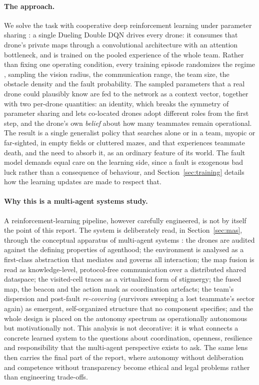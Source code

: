 \paragraph{The approach.}
We solve the task with cooperative deep reinforcement learning under parameter
sharing \citep{gupta2017cooperative}: a single Dueling Double DQN
\citep{mnih2015human,vanhasselt2016double,wang2016dueling} drives every drone:
it consumes that drone's private maps through a convolutional architecture with
an attention bottleneck, and is trained on the pooled experience of the whole
team.
Rather than fixing one operating condition, every training episode randomizes the
regime \citep{tobin2017domain}, sampling the vision radius, the communication
range, the team size, the obstacle density and the fault probability. The sampled
parameters that a real drone could plausibly know are fed to the network as
a context vector,
together with two per-drone quantities: an identity, which breaks the symmetry of
parameter sharing and lets co-located drones adopt different roles from the first
step, and the drone's own \emph{belief} about how many teammates remain
operational. The result is a single generalist policy that searches alone or in a
team, myopic or far-sighted, in empty fields or cluttered mazes, and that
experiences teammate death, and the need to absorb it, as an ordinary feature of
its world. The fault model demands equal care on the learning side, since a fault
is exogenous bad luck rather than a consequence of behaviour, and
Section~\ref{sec:training} details how the learning updates are made to respect
that.

\paragraph{Why this is a multi-agent systems study.}
A reinforcement-learning pipeline, however carefully engineered, is not by itself
the point of this report. The system is deliberately read, in
Section~\ref{sec:mas}, through the conceptual apparatus of multi-agent systems
\citep{wooldridge2009introduction,jennings2001agent}: the drones are audited
against the defining properties of agenthood; the environment is analysed as a
first-class abstraction that mediates and governs all interaction; the map fusion
is read as knowledge-level, protocol-free communication over a distributed shared
dataspace; the visited-cell traces as a virtualized form of stigmergy; the fused
map, the beacon and the action mask as coordination artefacts; the team's
dispersion and post-fault \emph{re-covering} (survivors sweeping a lost
teammate's sector again) as emergent, self-organized structure that
no component specifies; and the whole design is placed on the autonomy spectrum
as operationally autonomous but motivationally not. This analysis is not
decorative: it is what connects a concrete learned system to the questions about
coordination, openness, resilience and responsibility that the multi-agent
perspective exists to ask. The same lens then carries the final part of the
report, where autonomy without deliberation and competence without transparency
become ethical and legal problems rather than engineering trade-offs.

